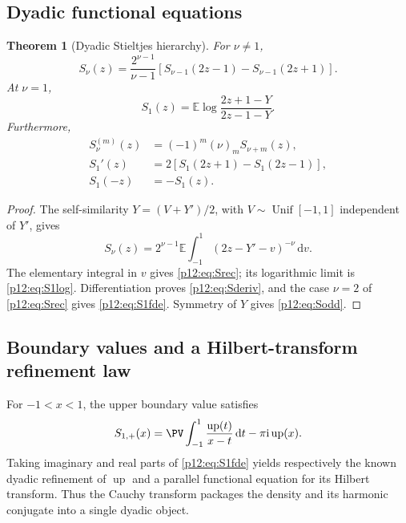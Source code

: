 \documentclass[11pt,oneside]{article}
\newtheorem{theorem}{Theorem}[section]
\theoremstyle{definition}
\theoremstyle{remark}
\newcommand{\Up}{\operatorname{up}}
\newcommand{\E}{\mathbb E}
\newcommand{\dd}{\,\mathrm d}
\newcommand{\ii}{\mathrm i}
\newcommand{\1}{\mathbf 1}
\begin{document}
\subsection{Dyadic functional equations}

\begin{theorem}[Dyadic Stieltjes hierarchy\tagnew]\label{p12:thm:Snu}
For \(\nu\ne1\),
\begin{equation}\label{p12:eq:Srec}
 \boxed{
 S_\nu(z)=\frac{2^{\nu-1}}{\nu-1}
 \left[S_{\nu-1}(2z-1)-S_{\nu-1}(2z+1)\right].}
\end{equation}
At \(\nu=1\),
\begin{equation}\label{p12:eq:S1log}
 S_1(z)=\E\log\frac{2z+1-Y}{2z-1-Y}.
\end{equation}
Furthermore,
\begin{align}
 S_\nu^{(m)}(z)&=(-1)^m(\nu)_mS_{\nu+m}(z),\label{p12:eq:Sderiv}\\
 S_1'(z)&=2\left[S_1(2z+1)-S_1(2z-1)\right],\label{p12:eq:S1fde}\\
 S_1(-z)&=-S_1(z).\label{p12:eq:Sodd}
\end{align}
\end{theorem}

\begin{proof}
The self-similarity \(Y=(V+Y')/2\), with
\(V\sim\operatorname{Unif}[-1,1]\) independent of \(Y'\), gives
\[
 S_\nu(z)=2^{\nu-1}\E\int_{-1}^1(2z-Y'-v)^{-\nu}\dd v.
\]
The elementary integral in \(v\) gives \eqref{p12:eq:Srec}; its logarithmic limit is
\eqref{p12:eq:S1log}.  Differentiation proves \eqref{p12:eq:Sderiv}, and the case
\(\nu=2\) of \eqref{p12:eq:Srec} gives \eqref{p12:eq:S1fde}.  Symmetry of \(Y\) gives
\eqref{p12:eq:Sodd}.
\end{proof}

\subsection{Boundary values and a Hilbert-transform refinement law}

For \(-1<x<1\), the upper boundary value satisfies
\begin{equation}\label{p12:eq:Sboundary}
 S_{1,+}(x)=\PV\int_{-1}^1\frac{\Up(t)}{x-t}\dd t-\pi\ii\Up(x).
\end{equation}
Taking imaginary and real parts of \eqref{p12:eq:S1fde} yields respectively the
known dyadic refinement of \(\Up\) and a parallel functional equation for its
Hilbert transform.  Thus the Cauchy transform packages the density and its
harmonic conjugate into a single dyadic object.
\end{document}
